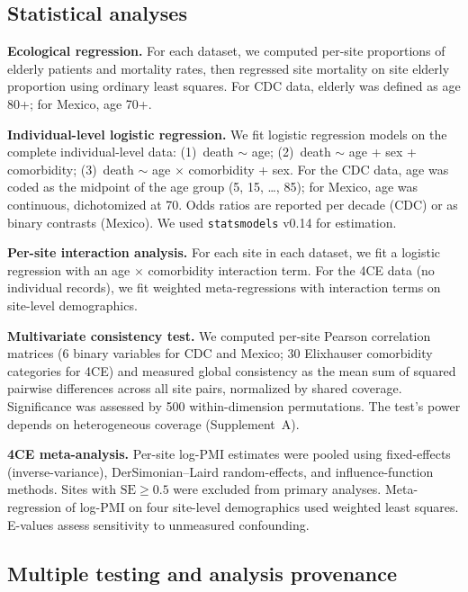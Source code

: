 \documentclass[11pt]{article}
\begin{document}
\subsection{Statistical analyses}

\textbf{Ecological regression.}  For each dataset, we computed per-site
proportions of elderly patients and mortality rates, then regressed site
mortality on site elderly proportion using ordinary least squares.  For CDC
data, elderly was defined as age 80+; for Mexico, age 70+.

\textbf{Individual-level logistic regression.}  We fit logistic regression
models on the complete individual-level data: (1)~death $\sim$ age;
(2)~death $\sim$ age + sex + comorbidity; (3)~death $\sim$ age $\times$
comorbidity + sex.  For the CDC data, age was coded as the midpoint of the
age group (5, 15, \ldots, 85); for Mexico, age was continuous, dichotomized
at 70.  Odds ratios are reported per decade (CDC) or as binary contrasts
(Mexico).  We used \texttt{statsmodels} v0.14 for estimation.

\textbf{Per-site interaction analysis.}  For each site in each dataset, we
fit a logistic regression with an age $\times$ comorbidity interaction term.
For the 4CE data (no individual records), we fit weighted meta-regressions
with interaction terms on site-level demographics.

\textbf{Multivariate consistency test.}  We computed per-site Pearson
correlation matrices (6 binary variables for CDC and Mexico; 30 Elixhauser
comorbidity categories for 4CE) and measured global consistency as the mean
sum of squared pairwise differences across all site pairs, normalized by
shared coverage.  Significance was assessed by 500 within-dimension
permutations.  The test's power depends on heterogeneous coverage
(Supplement~A).

\textbf{4CE meta-analysis.}  Per-site log-PMI estimates were pooled using
fixed-effects (inverse-variance), DerSimonian--Laird random-effects, and
influence-function methods.  Sites with $\text{SE} \geq 0.5$ were excluded
from primary analyses.  Meta-regression of log-PMI on four site-level
demographics used weighted least squares.  E-values \cite{vanderweele2017}
assess sensitivity to unmeasured confounding.

\subsection{Multiple testing and analysis provenance}
\end{document}
